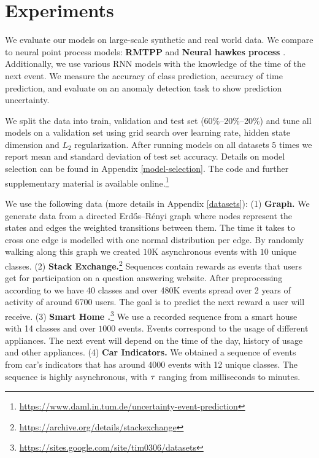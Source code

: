 \section{Experiments}
\label{sec:experiments_010}

We evaluate our models on large-scale synthetic and real world data. We compare to neural point process models: \textbf{RMTPP} \cite{RMTPP} and \textbf{Neural hawkes process} \cite{hawkes}. Additionally, we use various RNN models with the knowledge of the time of the next event. We measure the accuracy of class prediction, accuracy of time prediction, and evaluate on an anomaly detection task to show prediction uncertainty.

We split the data into train, validation and test set (60\%--20\%--20\%) and tune all models on a validation set using grid search over learning rate, hidden state dimension and $L_2$ regularization. After running models on all datasets $5$ times we report mean and standard deviation of test set accuracy. Details on model selection can be found in Appendix \ref{model-selection}. The code and further supplementary material is available online.\footnote{\url{https://www.daml.in.tum.de/uncertainty-event-prediction}}

We use the following data (more details in Appendix \ref{datasets}): (1) \textbf{Graph.} We generate data from a directed Erdős–Rényi graph where nodes represent the states and edges the weighted transitions between them. The time it takes to cross one edge is modelled with one normal distribution per edge. By randomly walking along this graph we created $10$K asynchronous events with $10$ unique classes.
(2) \textbf{Stack Exchange.}\footnote{\url{https://archive.org/details/stackexchange}} Sequences contain rewards as events that users get for participation on a question answering website. After preprocessing according to \cite{RMTPP} we have 40 classes and over 480K events spread over 2 years of activity of around 6700 users. The goal is to predict the next reward a user will receive.
(3) \textbf{Smart Home \normalfont\cite{SmartHome}.}\footnote{\url{https://sites.google.com/site/tim0306/datasets}} We use a recorded sequence from a smart house with 14 classes and over $1000$ events. Events correspond to the usage of different appliances. The next event will depend on the time of the day, history of usage and other appliances.
(4) \textbf{Car Indicators.} We obtained a sequence of events from car's indicators that has around $4000$ events with 12 unique classes. The sequence is highly asynchronous, with $\tau$ ranging from milliseconds to minutes.

\label{visualization}

\label{event_prediction}

\label{time_prediction}

\label{anomaly_detection}
